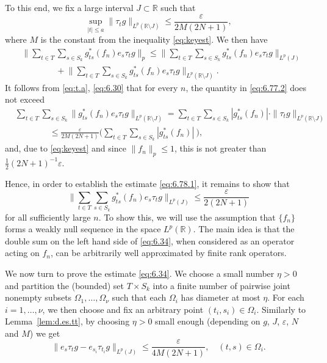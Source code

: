 \documentclass[reqno,a4paper,12pt]{amsart}
\numberwithin{equation}{section}
\numberwithin{figure}{section}
\newcommand\R{\mathbb{R}}
\newcommand\1{\mathds{1}}
\newcommand\eps{\varepsilon}
\newcommand{\TTT}{T}
\newcommand{\SSS}{S}
\newcommand{\ts}{\tau}
\renewcommand\le{\leqslant}
\theoremstyle{plain}
\newcommand{\lemref}[1]{Lemma~\ref{#1}}
\theoremstyle{definition}
\begin{document}
To this end, we fix a large interval $J\subset\R$ such that
\begin{equation}
\label{eq:6.30}
\sup_{|t| \le a} \|\ts_t g\|_{L^p(\R\setminus J)} \le
\frac{\eps}{2M   (2N+1)},
\end{equation}
where $M$ is the constant from the inequality
\eqref{eq:keyest}. We then have
\begin{align}
&\Big\| \sum_{t\in\TTT}  \sum_{s\in \SSS_k}
 g_{ts}^*(f_n) e_s \ts_t g \Big\|_p 
\le \Big\|  \sum_{t\in\TTT} \sum_{s\in \SSS_k}
 g_{ts}^*(f_n) e_s \ts_t g \Big\|_{L^p(J)} \label{eq:6.77.1} \\
& \qquad  \qquad + \Big\|  \sum_{t\in\TTT} \sum_{s\in \SSS_k}
 g_{ts}^*(f_n) e_s \ts_t g \Big\|_{L^p(\R\setminus J)}. \label{eq:6.77.2}
\end{align}
It follows from \eqref{eq:t.a}, \eqref{eq:6.30} that  for every $n$, the 
quantity in \eqref{eq:6.77.2} does not exceed
\begin{align}
&  \sum_{t\in\TTT} \sum_{s\in\SSS_k} 
\|g_{ts}^*(f_n) e_s \ts_t g\|_{L^p(\R\setminus J)} 
=  \sum_{t\in\TTT} \sum_{s\in\SSS_k}
  |g_{ts}^*(f_n)|\cdot \|\ts_t g\|_{L^p(\R\setminus J)} \\
& \qquad \qquad \le  \frac{\eps}{2M (2N+1)} 
\Big( \sum_{t\in\TTT} \sum_{s\in \SSS_k} |g_{ts}^*(f_n)|\ \Big),
\end{align}
and, due to \eqref{eq:keyest} and since $\|f_n\|_p \le 1$,
 this is not greater than  $\frac1{2} (2N+1)^{-1} \eps$.

Hence, in order to establish the estimate
\eqref{eq:6.78.1}, it remains to show that
\begin{equation}
\label{eq:6.34}
\Big\| \sum_{t\in\TTT} \sum_{s\in \SSS_k} 
g_{ts}^*(f_n) e_s \ts_t g \Big\|_{L^p(J)}\le  \frac{\eps}{2(2N+1)}
\end{equation}
for all sufficiently large $n$. To show this, we will
use the assumption that $\{ f_n \}$ forms a weakly
null sequence in the space $L^p(\R)$. The main idea is that the double sum 
on the left hand side of \eqref{eq:6.34}, when
considered as an operator acting on $f_n$, 
can be arbitrarily well approximated by finite rank operators.

We now turn to prove the estimate \eqref{eq:6.34}.
We choose a small number $\eta > 0 $ and 
partition the (bounded) set $T \times S_k$ into a finite number
of pairwise joint nonempty subsets $\Omega_1, \dots, \Omega_\nu$ 
such that each $\Omega_i$ has diameter at most $\eta$.
For each $i = 1,\dots, \nu$, we then choose and fix an arbitrary point
$(t_i,s_i) \in \Omega_i$. Similarly to \lemref{lem:d.es.tt}, by
choosing $\eta  >  0 $ small enough  
(depending on $g$, $J$, $\eps$, $N$ and $M$)
we get
\begin{equation}\label{eq:6.36}
\| e_s \ts_t g  - e_{s_i} \ts_{t_i} g\|_{L^p(J)}
\le \frac{\eps}{4M (2N+1)}, \quad (t,s) \in \Omega_i.
\end{equation}
\end{document}
